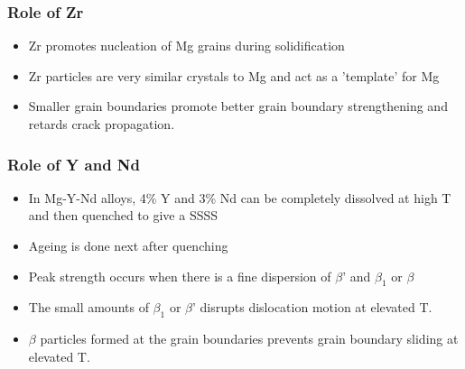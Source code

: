 
\subsubsection{Role of Zr} %
\label{ssub:role_of_zr}
\begin{itemize}
  \item Zr promotes nucleation of Mg grains during solidification
  \item Zr particles are very similar crystals to Mg and act as a 'template' for Mg
  \item Smaller grain boundaries promote better grain boundary strengthening and retards crack propagation.
\end{itemize}

\subsubsection{Role of Y and Nd} %
\label{ssub:role_of_y_and_nd}

\begin{itemize}
  \item In Mg-Y-Nd alloys, 4\% Y and 3\% Nd can be completely dissolved at high T and then quenched to give a SSSS
  \item Ageing is done next after quenching
  \item Peak strength occurs when there is a fine dispersion of $\beta$' and $\beta_1$ or $\beta$
  \item The small amounts of $\beta_1$ or $\beta$' disrupts dislocation motion at elevated T.
  \item $\beta$ particles formed at the grain boundaries prevents grain boundary sliding at elevated T.
\end{itemize}
